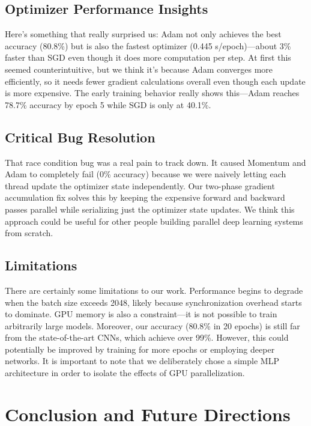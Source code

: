 \documentclass[conference]{IEEEtran}
\begin{document}
\subsection{Optimizer Performance Insights}

Here's something that really surprised us: Adam not only achieves the best accuracy (80.8\%) but is also the fastest optimizer (0.445 s/epoch)—about 3\% faster than SGD even though it does more computation per step. At first this seemed counterintuitive, but we think it's because Adam converges more efficiently, so it needs fewer gradient calculations overall even though each update is more expensive. The early training behavior really shows this—Adam reaches 78.7\% accuracy by epoch 5 while SGD is only at 40.1\%.

\subsection{Critical Bug Resolution}

That race condition bug was a real pain to track down. It caused Momentum and Adam to completely fail (0\% accuracy) because we were naively letting each thread update the optimizer state independently. Our two-phase gradient accumulation fix solves this by keeping the expensive forward and backward passes parallel while serializing just the optimizer state updates. We think this approach could be useful for other people building parallel deep learning systems from scratch.

\subsection{Limitations}

There are certainly some limitations to our work. Performance begins to degrade when the batch size exceeds 2048, likely because synchronization overhead starts to dominate. GPU memory is also a constraint---it is not possible to train arbitrarily large models. Moreover, our accuracy (80.8\% in 20 epochs) is still far from the state-of-the-art CNNs, which achieve over 99\%. However, this could potentially be improved by training for more epochs or employing deeper networks. It is important to note that we deliberately chose a simple MLP architecture in order to isolate the effects of GPU parallelization.



\section{Conclusion and Future Directions}
\end{document}
